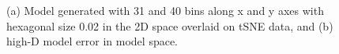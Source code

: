 \documentclass[
  12pt]{article}
\begin{document}
\begin{figure}[H]


\caption{\label{fig-nldervisPBMCtSNE}(a) Model generated with 31 and 40
bins along x and y axes with hexagonal size 0.02 in the 2D space
overlaid on tSNE data, and (b) high-D model error in model space.}

\end{figure}%
\end{document}
